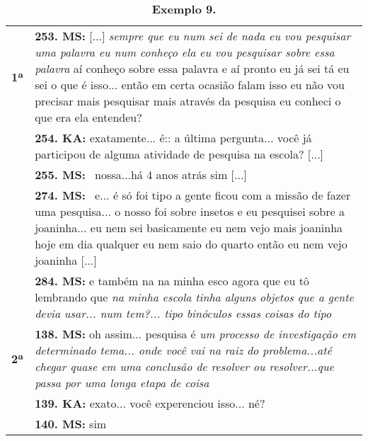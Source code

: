 \begin{table}[!t] %
	\centering
	\small
	\begin{threeparttable}
		\caption*{\textbf{Exemplo 9.} }
		\label{tab-10}
		\begin{tabular}{@{} 
				>{\raggedright\arraybackslash}p{} 
				>{\raggedright\arraybackslash}p{} @{}}
			\toprule\noalign{}
			\multirow{2}{*}{Milton Santos: compreensão de pesquisa}
			\linebreak
			 \\
			\midrule\noalign{}
			
			
			
			
			\textbf{1ª } & \textbf{253. MS:} {[}...{]} \emph{sempre que eu num sei de nada eu vou pesquisar uma palavra eu num conheço ela eu vou pesquisar sobre essa palavra} aí conheço sobre essa palavra e aí pronto eu já sei tá eu sei o que é isso... então em certa ocasião falam isso eu não vou precisar mais pesquisar mais através da pesquisa eu conheci o que era ela entendeu? \\
			
			& \textbf{254. KA:} exatamente... é:: a última pergunta... você já participou de alguma atividade de pesquisa na escola? {[}...{]} \\
			
			& \textbf{255. MS:} ~nossa...há 4 anos atrás sim {[}...{]} \\
			
			& \textbf{274. MS:} ~e... é só foi tipo a gente ficou com a missão de fazer uma pesquisa... o nosso foi sobre insetos e eu pesquisei sobre a joaninha... eu nem sei basicamente eu nem vejo mais joaninha hoje em dia qualquer eu nem saio do quarto então eu nem vejo joaninha {[}...{]} \\
			
			& \textbf{284. MS: }e também na na minha esco agora que eu tô lembrando que \emph{na minha escola tinha alguns objetos que a gente devia usar... num tem?... tipo binóculos essas coisas do tipo} \\
            \midrule
			
			\textbf{2ª } & \textbf{138. MS:} oh assim... pesquisa é \emph{um processo de investigação em determinado tema... onde você vai na raiz do problema...até chegar quase em uma conclusão de resolver ou resolver...que passa por uma longa etapa de coisa} \\
			
			& \textbf{139. KA:} exato... você experenciou isso... né? \\
			
			& \textbf{140. MS:} sim\label{anchor-14}{}\label{anchor-15}{}\label{anchor-16}{} \\
			
		\end{tabular}
	\end{threeparttable}
\end{table}
